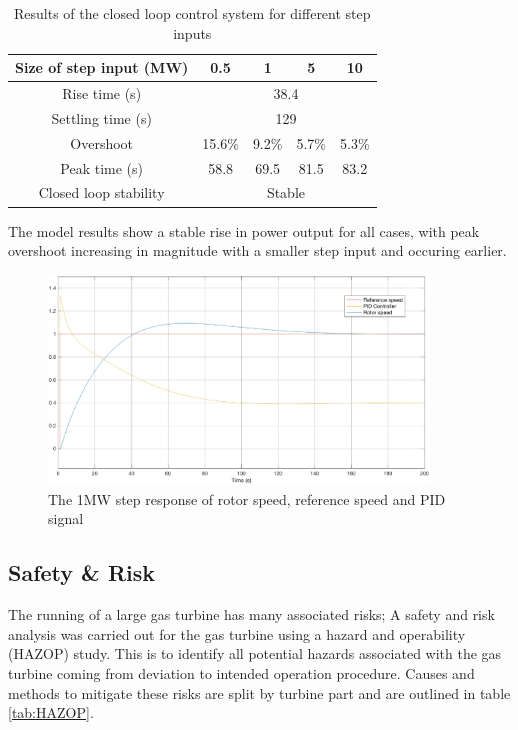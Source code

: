 \documentclass[11pt, oneside]{article}
\begin{document}
 \begin {table} [h]
\begin{center}
\caption{Results of the closed loop control system for different step inputs} \label{tab:controlresults} 
\begin{tabular}{ |c|c|c|c|c|}
 \hline
 Size of step input (MW) & 0.5 & 1 & 5 & 10\\
 \hline
  Rise time (s) & \multicolumn{4}{|c|}{38.4}\\ 
 \hline
  Settling time (s) & \multicolumn{4}{|c|}{129}\\ 
  \hline
  Overshoot & 15.6\% & 9.2\% & 5.7\% & 5.3\%\\ 
  \hline
  Peak time (s) & 58.8 & 69.5 & 81.5 & 83.2 \\
 \hline
 Closed loop stability & \multicolumn{4}{|c|}{Stable}\\
 \hline
\end{tabular}
\end{center}  
\end {table}

The model results show a stable rise in power output for all cases, with peak overshoot increasing in magnitude with a smaller step input and occuring earlier.


\begin{figure} [h]
\centering
\includegraphics[width=0.9\textwidth]{./pictures/scope.eps}
  \caption{The 1MW step response of rotor speed, reference speed and PID signal} \label{fig:scope}
  \end{figure}

\subsection{Safety \& Risk}
The running of a large gas turbine has many associated risks; A safety and risk analysis was carried out for the gas turbine using a hazard and operability (HAZOP) study. This is to identify all potential hazards associated with the gas turbine coming from deviation to intended operation procedure. Causes and methods to mitigate these risks are split by turbine part and are outlined in table \ref{tab:HAZOP}.
\end{document}
